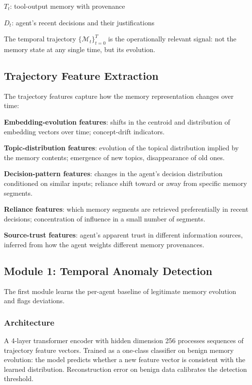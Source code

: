 \documentclass[sigconf,nonacm]{acmart}
\begin{document}
\textbf{$T_t$}: tool-output memory with provenance

\textbf{$D_t$}: agent's recent decisions and their justifications

The temporal trajectory $\{\mathcal{M}_t\}_{t=0}^{T}$ is the
operationally relevant signal: not the memory state at any single
time, but its evolution.

\subsection{Trajectory Feature Extraction}

The trajectory features capture how the memory representation
changes over time:

\textbf{Embedding-evolution features}: shifts in the centroid and
distribution of embedding vectors over time; concept-drift indicators.

\textbf{Topic-distribution features}: evolution of the topical
distribution implied by the memory contents; emergence of new topics,
disappearance of old ones.

\textbf{Decision-pattern features}: changes in the agent's decision
distribution conditioned on similar inputs; reliance shift toward or
away from specific memory segments.

\textbf{Reliance features}: which memory segments are retrieved
preferentially in recent decisions; concentration of influence in a
small number of segments.

\textbf{Source-trust features}: agent's apparent trust in different
information sources, inferred from how the agent weights different
memory provenances.

\subsection{Module 1: Temporal Anomaly Detection}

The first module learns the per-agent baseline of legitimate memory
evolution and flags deviations.

\subsubsection{Architecture}

A 4-layer transformer encoder with hidden dimension 256 processes
sequences of trajectory feature vectors. Trained as a one-class
classifier on benign memory evolution: the model predicts whether a
new feature vector is consistent with the learned distribution.
Reconstruction error on benign data calibrates the detection
threshold.
\end{document}
